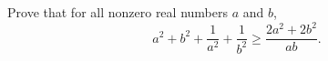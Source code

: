 Prove that for all nonzero real numbers $a$ and $b$,
\[a^2+b^2+\dfrac{1}{a^2}+\dfrac{1}{b^2}\ge\dfrac{2a^2+2b^2}{ab}.\]

